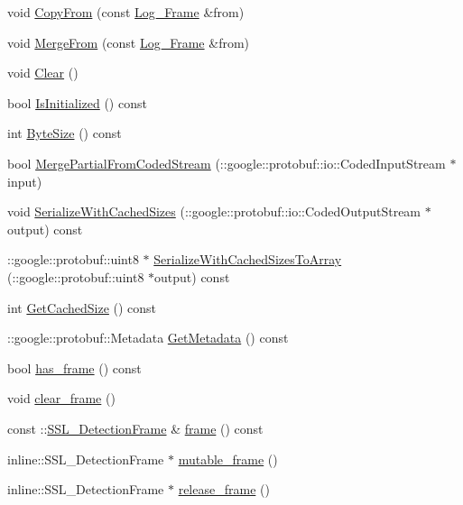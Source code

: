 \begin{DoxyCompactItemize}
\item 
void \hyperlink{class_log___frame_ab760550a8c2c85d5c1061ccc13cd16af}{Copy\-From} (const \hyperlink{class_log___frame}{Log\-\_\-\-Frame} \&from)
\item 
void \hyperlink{class_log___frame_ab83184e5083279bc01f964e8b446378a}{Merge\-From} (const \hyperlink{class_log___frame}{Log\-\_\-\-Frame} \&from)
\item 
void \hyperlink{class_log___frame_ac1a3499411fc9e9f5314e62eaa74c5fb}{Clear} ()
\item 
bool \hyperlink{class_log___frame_aac7ecd6b757a3eef7191a53e63c336ce}{Is\-Initialized} () const 
\item 
int \hyperlink{class_log___frame_a3f7a50a03a8e3b89545189abeecb1745}{Byte\-Size} () const 
\item 
bool \hyperlink{class_log___frame_ae7b8510e40a41766453fbb3a1151281e}{Merge\-Partial\-From\-Coded\-Stream} (\-::google\-::protobuf\-::io\-::\-Coded\-Input\-Stream $\ast$input)
\item 
void \hyperlink{class_log___frame_ad25c4b901073eb9116d1215982ea11c1}{Serialize\-With\-Cached\-Sizes} (\-::google\-::protobuf\-::io\-::\-Coded\-Output\-Stream $\ast$output) const 
\item 
\-::google\-::protobuf\-::uint8 $\ast$ \hyperlink{class_log___frame_a713928a500cdbcbf0ac459ea054d094b}{Serialize\-With\-Cached\-Sizes\-To\-Array} (\-::google\-::protobuf\-::uint8 $\ast$output) const 
\item 
int \hyperlink{class_log___frame_abddf4f7f609ec5880629c81bfebcbc95}{Get\-Cached\-Size} () const 
\item 
\-::google\-::protobuf\-::\-Metadata \hyperlink{class_log___frame_a4d0277a0f030d0651f46b37fd13a8604}{Get\-Metadata} () const 
\item 
bool \hyperlink{class_log___frame_ac19f879726af3c9bafaaf6a1eb5e94da}{has\-\_\-frame} () const 
\item 
void \hyperlink{class_log___frame_aec77bd4828b060974153185857c32631}{clear\-\_\-frame} ()
\item 
const \-::\hyperlink{class_s_s_l___detection_frame}{S\-S\-L\-\_\-\-Detection\-Frame} \& \hyperlink{class_log___frame_a051fb92f154ef0d775e191a99d2fef06}{frame} () const 
\item 
inline\-::\-S\-S\-L\-\_\-\-Detection\-Frame $\ast$ \hyperlink{class_log___frame_a33deb89a473482e2c1406154d95325fd}{mutable\-\_\-frame} ()
\item 
inline\-::\-S\-S\-L\-\_\-\-Detection\-Frame $\ast$ \hyperlink{class_log___frame_afd0ffcb09a25e801e6fc87b22d5e12a7}{release\-\_\-frame} ()

\end{DoxyCompactItemize}
